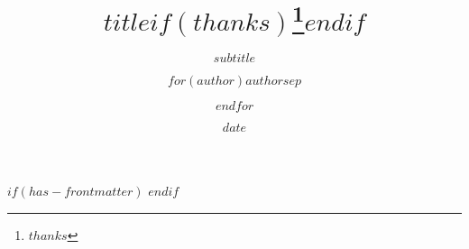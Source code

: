 \documentclass[
  fontsize=11pt,%
  UKenglish,
  paper=a4,
  twoside,
  openright,
  headinclude,%
  footinclude,%
  BCOR=0mm,%
  cleardoublepage=empty,%
  usegeometry,%
  numbers=noenddot,%
]{scrbook}
\title{$title$$if(thanks)$\thanks{$thanks$}$endif$}
\subtitle{$subtitle$}
\author{$for(author)$$author$$sep$ \and $endfor$}
\date{$date$}
\begin{document}
\frenchspacing
\raggedbottom

\pagestyle{plain}

$if(has-frontmatter)$
\frontmatter
$endif$


% 

\end{document}
